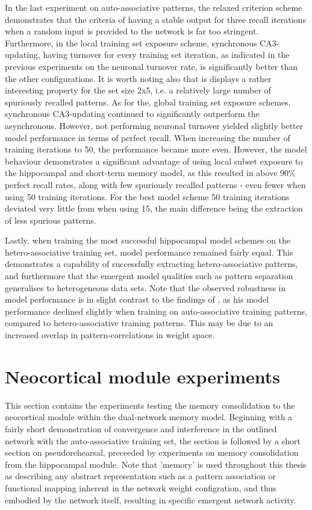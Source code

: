 In the last experiment on auto-associative patterns, the relaxed criterion scheme demonstrates that the criteria of having a stable output for three recall iterations when a random input is provided to the network is far too stringent. Furthermore, in the local training set exposure scheme, synchronous CA3-updating, having turnover for every training set iteration, as indicated in the previous experiments on the neuronal turnover rate, is significantly better than the other configurations. It is worth noting also that is displays a rather interesting property for the set size 2x5, i.e. a relatively large number of spuriously recalled patterns. As for the, global training set exposure schemes, synchronous CA3-updating continued to significantly outperform the asynchronous. However, not performing neuronal turnover yielded slightly better model performance in terms of perfect recall. When increasing the number of training iterations to 50, the performance became more even. However, the model behaviour demonstrates a significant advantage of using local subset exposure to the hippocampal and short-term memory model, as this resulted in above $90 \%$ perfect recall rates, along with few spuriously recalled patterns - even fewer when using 50 training iterations. For the best model scheme 50 training iterations deviated very little from when using 15, the main difference being the extraction of less spurious patterns.

Lastly, when training the most successful hippocampal model schemes on the hetero-associative training set, model performance remained fairly equal. This demonstrates a capability of successfully extracting hetero-associative patterns, and furthermore that the emergent model qualities such as pattern separation generalises to heterogeneous data sets. Note that the observed robustness in model performance is in slight contrast to the findings of \citep{Hattori2014}, as his model performance declined slightly when training on auto-associative training patterns, compared to hetero-associative training patterns. This may be due to an increased overlap in pattern-correlations in weight space.




\section{Neocortical module experiments}

This section contains the experiments testing the memory consolidation to the neocortical module within the dual-network memory model. Beginning with a fairly short demonstration of convergence and interference in the outlined network with the auto-associative training set, the section is followed by a short section on pseudorehearsal, preceeded by experiments on memory consolidation from the hippocampal module. Note that 'memory' is used throughout this thesis as describing any abstract representation such as a pattern association or functional mapping inherent in the network weight configration, and thus embodied by the network itself, resulting in specific emergent network activity.

